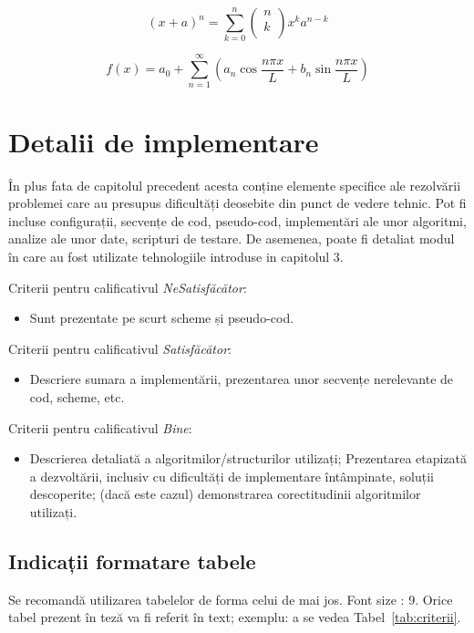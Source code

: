 \documentclass[12pt,a4paper]{report}
\begin{document}
\begin{equation}
(x+a)^n = \sum_{k=0}^{n}\left(\begin{array}{c}n\\k\\\end{array}\right)x^ka^{n-k}
\end{equation}

\begin{equation}
f(x) = a_0 + \sum_{n=1}^{\infty}\left(a_n \cos\frac{n\pi x}{L} + b_n\sin\frac{n\pi x}{L}\right)
\end{equation}



\chapter{Detalii de implementare}
În plus fata de capitolul precedent acesta conține elemente specifice ale rezolvării problemei care au presupus dificultăți deosebite din punct de vedere tehnic. Pot fi incluse configurații, secvențe de cod, pseudo-cod, implementări ale unor algoritmi, analize ale unor date, scripturi de testare. De asemenea, poate fi detaliat modul în care au fost utilizate tehnologiile introduse in capitolul 3.


Criterii pentru calificativul \textit{Ne\textit{Satisfăcător}}: 
\begin{itemize}
	\item	Sunt prezentate pe scurt scheme și pseudo-cod.
\end{itemize}
Criterii pentru calificativul \textit{Satisfăcător}: 
\begin{itemize}
	\item	Descriere sumara a implementării, prezentarea unor secvențe nerelevante de cod, scheme, etc. 
\end{itemize}
Criterii pentru calificativul \textit{Bine}: 
\begin{itemize}
	\item	Descrierea detaliată a algoritmilor/structurilor utilizați; Prezentarea etapizată a dezvoltării, inclusiv cu dificultăți de implementare întâmpinate, soluții descoperite; (dacă este cazul) demonstrarea corectitudinii algoritmilor utilizați. 
\end{itemize}

\section{Indicații formatare tabele}
Se recomandă utilizarea tabelelor de forma celui de mai jos.  Font size :  9. 
Orice tabel prezent în teză va fi referit în text; exemplu: a se vedea Tabel~\ref{tab:criterii}.
\end{document}
